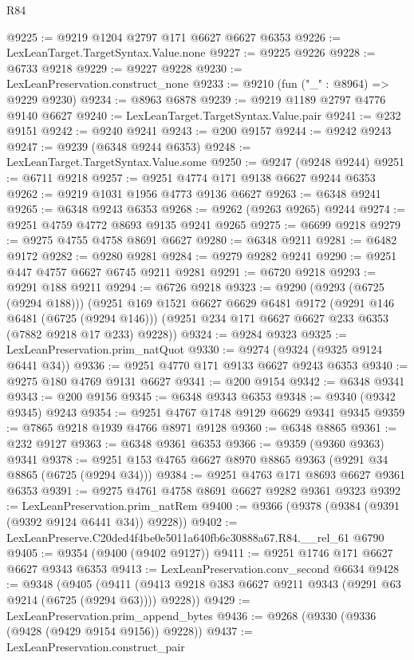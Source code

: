 \begin{lexlean}{R84}
\begin{coremodule}
@9225 := @9219 @1204 @2797 @171 @6627 @6627 @6353
@9226 := LexLeanTarget.TargetSyntax.Value.none
@9227 := @9225 @9226
@9228 := @6733 @9218
@9229 := @9227 @9228
@9230 := LexLeanPreservation.construct_none
@9233 := @9210 (fun ("_" : @8964) => @9229 @9230)
@9234 := @8963 @6878
@9239 := @9219 @1189 @2797 @4776 @9140 @6627
@9240 := LexLeanTarget.TargetSyntax.Value.pair
@9241 := @232 @9151
@9242 := @9240 @9241
@9243 := @200 @9157
@9244 := @9242 @9243
@9247 := @9239 (@6348 @9244 @6353)
@9248 := LexLeanTarget.TargetSyntax.Value.some
@9250 := @9247 (@9248 @9244)
@9251 := @6711 @9218
@9257 := @9251 @4774 @171 @9138 @6627 @9244 @6353
@9262 := @9219 @1031 @1956 @4773 @9136 @6627
@9263 := @6348 @9241
@9265 := @6348 @9243 @6353
@9268 := @9262 (@9263 @9265) @9244
@9274 := @9251 @4759 @4772 @8693 @9135 @9241 @9265
@9275 := @6699 @9218
@9279 := @9275 @4755 @4758 @8691 @6627
@9280 := @6348 @9211
@9281 := @6482 @9172
@9282 := @9280 @9281
@9284 := @9279 @9282 @9241
@9290 := @9251 @447 @4757 @6627 @6745 @9211 @9281
@9291 := @6720 @9218
@9293 := @9291 @188 @9211
@9294 := @6726 @9218
@9323 := @9290
    (@9293 (@6725 (@9294 @188)))
    (@9251
      @169
      @1521
      @6627
      @6629
      @6481
      @9172
      (@9291 @146 @6481 (@6725 (@9294 @146)))
      (@9251 @234 @171 @6627 @6627 @233 @6353 (@7882 @9218 @17 @233) @9228))
@9324 := @9284 @9323
@9325 := LexLeanPreservation.prim_natQuot
@9330 := @9274 (@9324 (@9325 @9124 @6441 @34))
@9336 := @9251 @4770 @171 @9133 @6627 @9243 @6353
@9340 := @9275 @180 @4769 @9131 @6627
@9341 := @200 @9154
@9342 := @6348 @9341
@9343 := @200 @9156
@9345 := @6348 @9343 @6353
@9348 := @9340 (@9342 @9345) @9243
@9354 := @9251 @4767 @1748 @9129 @6629 @9341 @9345
@9359 := @7865 @9218 @1939 @4766 @8971 @9128
@9360 := @6348 @8865
@9361 := @232 @9127
@9363 := @6348 @9361 @6353
@9366 := @9359 (@9360 @9363) @9341
@9378 := @9251 @153 @4765 @6627 @8970 @8865 @9363 (@9291 @34 @8865 (@6725 (@9294 @34)))
@9384 := @9251 @4763 @171 @8693 @6627 @9361 @6353
@9391 := @9275 @4761 @4758 @8691 @6627 @9282 @9361 @9323
@9392 := LexLeanPreservation.prim_natRem
@9400 := @9366 (@9378 (@9384 (@9391 (@9392 @9124 @6441 @34)) @9228))
@9402 := LexLeanPreserve.C20ded4f4be0e5011a640fb6c30888a67.R84.__rel_61 @6790
@9405 := @9354 (@9400 (@9402 @9127))
@9411 := @9251 @1746 @171 @6627 @6627 @9343 @6353
@9413 := LexLeanPreservation.conv_second @6634
@9428 := @9348
    (@9405 (@9411 (@9413 @9218 @383 @6627 @9211 @9343 (@9291 @63 @9214 (@6725 (@9294 @63)))) @9228))
@9429 := LexLeanPreservation.prim_append_bytes
@9436 := @9268 (@9330 (@9336 (@9428 (@9429 @9154 @9156)) @9228))
@9437 := LexLeanPreservation.construct_pair

\end{coremodule}
\end{lexlean}
